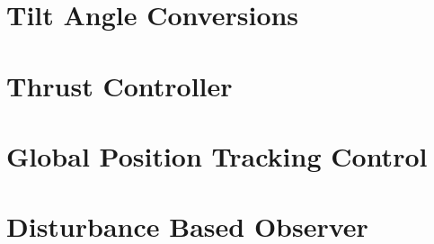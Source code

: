 	\section{Tilt Angle Conversions}
	
	\section{Thrust Controller}
	
	\section{Global Position Tracking Control}
	
	\section{Disturbance Based Observer}
	